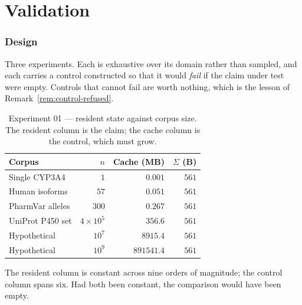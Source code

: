 \documentclass[11pt,twocolumn,a4paper]{article}
\newcommand{\Sch}{\Sigma}
\theoremstyle{plain}
\theoremstyle{definition}
\theoremstyle{remark}
\begin{document}
\part{Validation}
\section{Design}
\label{sec:validation}

Three experiments. Each is exhaustive over its domain rather than sampled,
and each carries a control constructed so that it would \emph{fail} if the
claim under test were empty. Controls that cannot fail are worth nothing,
which is the lesson of Remark~\ref{rem:control-refused}.

\begin{table}[H]
\centering
\small
\caption{Experiment 01 --- resident state against corpus size. The resident
column is the claim; the cache column is the control, which must grow.}
\label{tab:scaling}
\begin{tabular}{lrrr}
\toprule
Corpus & $n$ & Cache (MB) & $\Sch$ (B) \\
\midrule
Single CYP3A4      & $1$                & $0.001$      & $561$ \\
Human isoforms     & $57$               & $0.051$      & $561$ \\
PharmVar alleles   & $300$              & $0.267$      & $561$ \\
UniProt P450 set   & $4\times10^{5}$    & $356.6$      & $561$ \\
Hypothetical       & $10^{7}$           & $8915.4$     & $561$ \\
Hypothetical       & $10^{9}$           & $891541.4$   & $561$ \\
\bottomrule
\end{tabular}
\end{table}

The resident column is constant across nine orders of magnitude; the control
column spans six. Had both been constant, the comparison would have been
empty.
\end{document}

